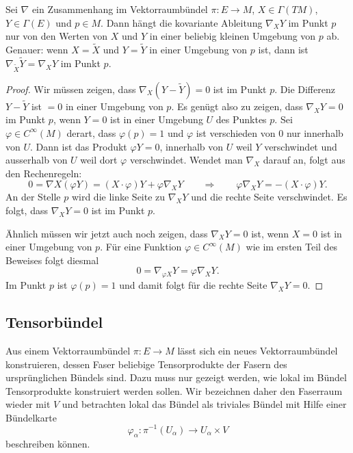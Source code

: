 \begin{lemma}
Sei $\nabla$ ein Zusammenhang im Vektorraumbündel $\pi\colon E\to M$,
$X\in \Gamma(TM)$, $Y\in \Gamma(E)$ und $p\in M$.
Dann hängt die kovariante Ableitung $\nabla_XY$ im Punkt $p$ nur von
den Werten von $X$ und $Y$ in einer beliebig kleinen Umgebung von $p$
ab.
Genauer: wenn $X=\tilde{X}$ und $Y=\tilde{Y}$ in einer Umgebung von
$p$ ist, dann ist $\nabla_{\tilde{X}}\tilde{Y} = \nabla_XY$ im Punkt $p$.
\end{lemma}

\begin{proof}
Wir müssen zeigen, dass $\nabla_X(Y-\tilde{Y})=0$ ist im Punkt $p$.
Die Differenz $Y-\tilde{Y}$ ist $=0$ in einer Umgebung von $p$.
Es genügt also zu zeigen, dass $\nabla_XY=0$ im Punkt $p$, wenn $Y=0$
ist in einer Umgebung $U$ des Punktes $p$.
Sei $\varphi\in C^\infty(M)$ derart, dass $\varphi(p)=1$ und 
$\varphi$ ist verschieden von $0$ nur innerhalb von $U$.
Dann ist das Produkt $\varphi Y=0$, innerhalb von $U$ weil $Y$ verschwindet
und ausserhalb von $U$ weil dort $\varphi$ verschwindet.
Wendet man $\nabla_X$ darauf an, folgt aus den Rechenregeln:
\[
0
=
\nabla X(\varphi Y)
=
(X\cdot \varphi)Y
+
\varphi\nabla_X Y
\qquad\Rightarrow\qquad
\varphi\nabla_X Y
=
-(X\cdot\varphi)Y.
\]
An der Stelle $p$ wird die linke Seite zu $\nabla_XY$ und die rechte
Seite verschwindet.
Es folgt, dass $\nabla_XY=0$ ist im Punkt $p$.

Ähnlich müssen wir jetzt auch noch zeigen, dass $\nabla_XY=0$ ist,
wenn $X=0$ ist in einer Umgebung von $p$.
Für eine Funktion $\varphi\in C^\infty(M)$ wie im ersten Teil des Beweises
folgt diesmal
\[
0
=
\nabla_{\varphi X}Y
=
\varphi\nabla_XY.
\]
Im Punkt $p$ ist $\varphi(p)=1$ und damit folgt für die rechte Seite
$\nabla_XY=0$.
\end{proof}

%
%
\subsection{Tensorbündel}
Aus einem Vektorraumbündel $\pi\colon E\to M$ lässt sich ein neues
Vektorraumbündel konstruieren, dessen Faser beliebige Tensorprodukte
der Fasern des ursprünglichen Bündels sind.
Dazu muss nur gezeigt werden, wie lokal im Bündel Tensorprodukte
konstruiert werden sollen.
Wir bezeichnen daher den Faserraum wieder mit $V$ und betrachten
lokal das Bündel als triviales Bündel mit Hilfe einer Bündelkarte
\[
\varphi_\alpha
\colon
\pi^{-1}(U_\alpha)
\to
U_\alpha\times V 
\]
beschreiben können.

